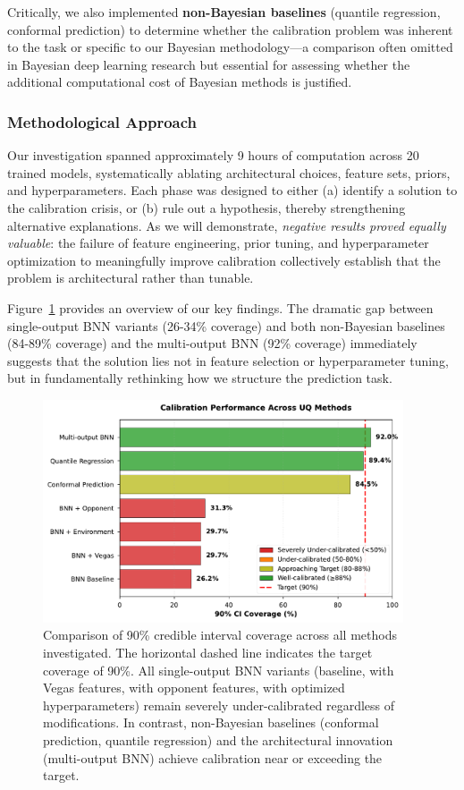 Critically, we also implemented \textbf{non-Bayesian baselines} (quantile regression, conformal prediction) to determine whether the calibration problem was inherent to the task or specific to our Bayesian methodology—a comparison often omitted in Bayesian deep learning research but essential for assessing whether the additional computational cost of Bayesian methods is justified.

\subsubsection{Methodological Approach}

Our investigation spanned approximately 9 hours of computation across 20 trained models, systematically ablating architectural choices, feature sets, priors, and hyperparameters. Each phase was designed to either (a) identify a solution to the calibration crisis, or (b) rule out a hypothesis, thereby strengthening alternative explanations. As we will demonstrate, \textit{negative results proved equally valuable}: the failure of feature engineering, prior tuning, and hyperparameter optimization to meaningfully improve calibration collectively establish that the problem is architectural rather than tunable.

Figure~\ref{fig:coverage_comparison_overview} provides an overview of our key findings. The dramatic gap between single-output BNN variants (26-34\% coverage) and both non-Bayesian baselines (84-89\% coverage) and the multi-output BNN (92\% coverage) immediately suggests that the solution lies not in feature selection or hyperparameter tuning, but in fundamentally rethinking how we structure the prediction task.

\begin{figure}[t]
    \centering
    \includegraphics[width=0.95\textwidth]{../figures/out/coverage_comparison_bar_chart.pdf}
    \caption{Comparison of 90\% credible interval coverage across all methods investigated. The horizontal dashed line indicates the target coverage of 90\%. All single-output BNN variants (baseline, with Vegas features, with opponent features, with optimized hyperparameters) remain severely under-calibrated regardless of modifications. In contrast, non-Bayesian baselines (conformal prediction, quantile regression) and the architectural innovation (multi-output BNN) achieve calibration near or exceeding the target.}
    \label{fig:coverage_comparison_overview}
\end{figure}

